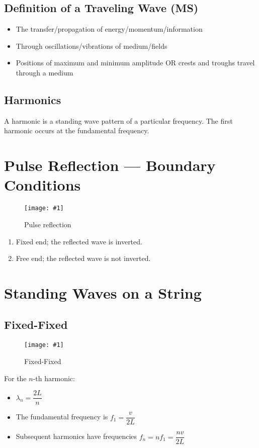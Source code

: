 \documentclass[a4paper,12pt]{article}
\let\oldsection\section
\renewcommand\section{\clearpage\oldsection}
\newcommand{\img}[4]{\begin{center}
  \begin{figure}[H]
    \centering
    \texttt{[image: \#1]}
    \caption{#3}
    \label{fig:#4}
  \end{figure}
\end{center}}
\begin{document}
\subsection{Definition of a Traveling Wave (MS)}

\begin{itemize}
  \item The transfer/propagation of energy/momentum/information
  \item Through oscillations/vibrations of medium/fields
  \item Positions of maximum and minimum amplitude OR crests and troughs travel through a medium
\end{itemize}

\subsection{Harmonics}

A harmonic is a standing wave pattern of a particular frequency. The first harmonic occurs at the fundamental frequency.


\section{Pulse Reflection --- Boundary Conditions}
\img{pulse.png}{0.8}{Pulse reflection}{pulse}

\begin{enumerate}
  \item Fixed end; the reflected wave is inverted.
  \item Free end; the reflected wave is not inverted.
\end{enumerate}

\section{Standing Waves on a String}

\subsection{Fixed-Fixed}

\img{string1.png}{0.65}{Fixed-Fixed}{string1}

For the $n$-th harmonic:
\begin{itemize}
  \item $\lambda_n = \dfrac{2L}{n}$
  \item The fundamental frequency is $f_1 = \dfrac{v}{2L}$
  \item Subsequent harmonics have frequencies $f_n = nf_1 = \dfrac{nv}{2L}$
\end{itemize}
\end{document}
